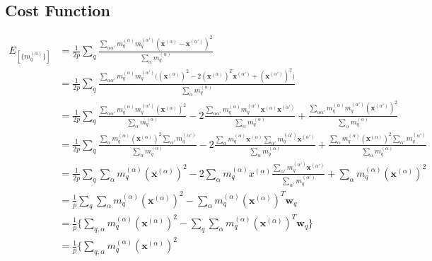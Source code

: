 \subsection{Cost Function}
\begin{align*}
	E_{ [ \{  m_q^{(\alpha)} \}] } &= \frac{1}{2p} \sum_q \frac{ \sum_{\alpha \alpha'} m_q^{(\alpha)} m_q^{(\alpha')} ( \boldsymbol{x}^{(\alpha)} - \boldsymbol{x}^{(\alpha')})^2  }{\sum_\alpha m_q^{(\alpha)} } \\
	&= \frac{1}{2p} \sum_q \frac{ \sum_{\alpha \alpha'} m_q^{(\alpha)} m_q^{(\alpha')} \bigg ( (\boldsymbol{x}^{(\alpha)})^2 - 2(\boldsymbol{x}^{(\alpha)})^T\boldsymbol{x}^{(\alpha')} + (\boldsymbol{x}^{(\alpha')})^2 \bigg )  }{\sum_\alpha m_q^{(\alpha)} } \\
	&= \frac{1}{2p} \sum_q \frac{ \sum_{\alpha \alpha'} m_q^{(\alpha)} m_q^{(\alpha')}  (\boldsymbol{x}^{(\alpha)})^2 
	}{\sum_\alpha m_q^{(\alpha)} } - 2 \frac{ \sum_{\alpha \alpha'} m_q^{(\alpha)} m_q^{(\alpha')}  \boldsymbol{x}^{(\alpha)}\boldsymbol{x}^{(\alpha')}
	}{\sum_\alpha m_q^{(\alpha)} } + \frac{ \sum_{\alpha \alpha'} m_q^{(\alpha)} m_q^{(\alpha')}  (\boldsymbol{x}^{(\alpha')})^2 
	}{\sum_\alpha m_q^{(\alpha)} } \\
	&= \frac{1}{2p} \sum_q \frac{ \sum_{\alpha} m_q^{(\alpha)} (\boldsymbol{x}^{(\alpha)})^2  \sum_{\alpha'} m_q^{(\alpha')}  
	}{\sum_\alpha m_q^{(\alpha)} } - 2 \frac{ \sum_{\alpha} m_q^{(\alpha)} \boldsymbol{x}^{(\alpha)} \sum_{\alpha'} m_q^{(\alpha')}  \boldsymbol{x}^{(\alpha')}
	}{\sum_\alpha m_q^{(\alpha)} } + \frac{ \sum_{\alpha} m_q^{(\alpha)} (\boldsymbol{x}^{(\alpha)})^2  \sum_{\alpha'} m_q^{(\alpha')}  
	}{\sum_\alpha m_q^{(\alpha)} } \\
	&= \frac{1}{2p} \sum_q \sum_{\alpha} m_q^{(\alpha)} (\boldsymbol{x}^{(\alpha)})^2  
- 2 \sum_{\alpha} m_q^{(\alpha)} x^{(\alpha)} \frac{  \sum_{\alpha'} m_q^{(\alpha')}  \boldsymbol{x}^{(\alpha')}
	}{\sum_{\alpha'} m_q^{(\alpha')} } + \sum_{\alpha} m_q^{(\alpha)} (\boldsymbol{x}^{(\alpha)})^2   \\
	&= \frac{1}{p} \sum_q \sum_{\alpha} m_q^{(\alpha)} (\boldsymbol{x}^{(\alpha)})^2  
-  \sum_{\alpha} m_q^{(\alpha)} (\boldsymbol{x}^{(\alpha)})^T \boldsymbol{w}_q \\
&= \frac{1}{p} \Bigg \{  \sum_{q, \alpha} m_q^{(\alpha)}  (\boldsymbol{x}^{(\alpha)})^2  
-   \sum_{q} \sum_{\alpha}m_q^{(\alpha)}  (\boldsymbol{x}^{(\alpha)})^T \boldsymbol{w}_q  \Bigg \}\\
&= \frac{1}{p} \Bigg \{  \sum_{q, \alpha} m_q^{(\alpha)}  (\boldsymbol{x}^{(\alpha)})^2  

\end{align*}
